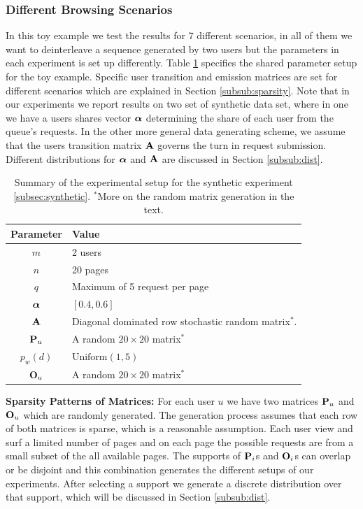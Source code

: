 \documentclass[conference]{IEEEtran}
\begin{document}
	\subsubsection{Different Browsing Scenarios}
	In this toy example we test the results for 7 different scenarios, in all of them we want to deinterleave a sequence generated by two users but the parameters in each experiment is set up differently.
	Table \ref{tab:toy} specifies the shared parameter setup for the toy example.
	Specific user transition and emission matrices are set for different scenarios which are explained in Section \ref{subsub:sparsity}.
	Note that in our experiments we report results on two set of synthetic data set, where in one we have a users shares vector $\aalpha$ determining the share of each user from the queue's requests.
	In the other more general data generating scheme, we assume that the users transition matrix $\A$ governs the turn in request submission.
	Different distributions for $\aalpha$ and $\A$ are discussed in Section \ref{subsub:dist}.
	
	\begin{table}
		\centering
		\begin{tabular}{|c|l|}
			\hline
			Parameter & Value \\ 
			\hline  
			$m$ & 2 users \\ \hline
			$n$ & 20 pages \\ \hline
			$q$ & Maximum of 5 request per page\\ \hline 
			\hline 
			$\aalpha$ & $[0.4, 0.6]$ \\ \hline 
			$\A$ & Diagonal dominated row stochastic random matrix$^*$. \\ \hline 
			$\P_u$ & A random $20 \times 20$ matrix$^*$ \\ \hline 			
			$p_w(d)$ & $\text{Uniform}(1,5)$ \\ \hline 
			$\O_u$ & A random $20 \times 20$ matrix$^*$ \\ \hline 
		\end{tabular}
		\caption{Summary of the experimental setup for the synthetic experiment \ref{subsec:synthetic}. $^*$More on the random matrix generation in the text.}
		\label{tab:toy}
	\end{table}
	
	{\bf Sparsity Patterns of Matrices:}
	\label{subsub:sparsity}
	For each user $u$ we have two matrices $\P_u$ and $\O_u$ which are randomly generated. 
	The generation process assumes that each row of both matrices is sparse, which is a reasonable assumption. 
	Each user view and surf a limited number of pages and on each page the possible requests are from a small subset of the all available pages. 
	The supports of $\P_i$s and $\O_i$s can overlap or be disjoint and this combination generates the different setups of our experiments.  
	After selecting a support we generate a discrete distribution over that support, which will be discussed in Section \ref{subsub:dist}.
	
\end{document}
